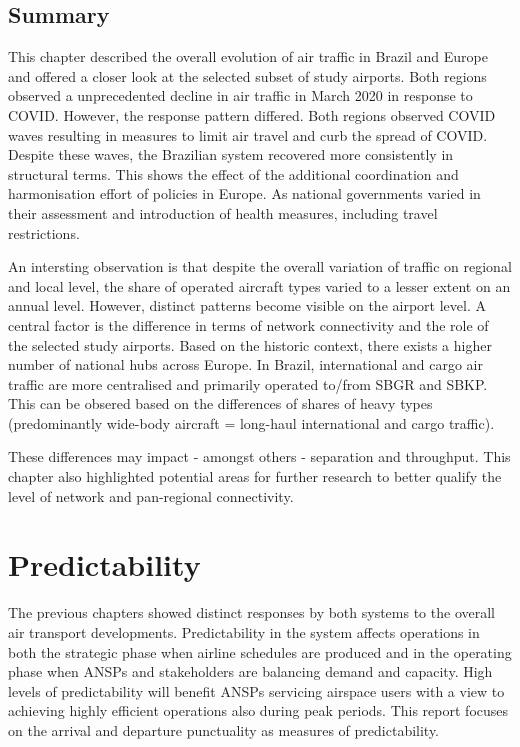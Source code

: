 \documentclass[
  a4paper,
  DIV=11,
  numbers=noendperiod]{scrreprt}
\begin{document}
\hypertarget{summary-1}{%
\section{Summary}\label{summary-1}}

This chapter described the overall evolution of air traffic in Brazil
and Europe and offered a closer look at the selected subset of study
airports. Both regions observed a unprecedented decline in air traffic
in March 2020 in response to COVID. However, the response pattern
differed. Both regions observed COVID waves resulting in measures to
limit air travel and curb the spread of COVID. Despite these waves, the
Brazilian system recovered more consistently in structural terms. This
shows the effect of the additional coordination and harmonisation effort
of policies in Europe. As national governments varied in their
assessment and introduction of health measures, including travel
restrictions.

An intersting observation is that despite the overall variation of
traffic on regional and local level, the share of operated aircraft
types varied to a lesser extent on an annual level. However, distinct
patterns become visible on the airport level. A central factor is the
difference in terms of network connectivity and the role of the selected
study airports. Based on the historic context, there exists a higher
number of national hubs across Europe. In Brazil, international and
cargo air traffic are more centralised and primarily operated to/from
SBGR and SBKP. This can be obsered based on the differences of shares of
heavy types (predominantly wide-body aircraft = long-haul international
and cargo traffic).

These differences may impact - amongst others - separation and
throughput. This chapter also highlighted potential areas for further
research to better qualify the level of network and pan-regional
connectivity.


\hypertarget{predictability}{%
\chapter{Predictability}\label{predictability}}

The previous chapters showed distinct responses by both systems to the
overall air transport developments. Predictability in the system affects
operations in both the strategic phase when airline schedules are
produced and in the operating phase when ANSPs and stakeholders are
balancing demand and capacity. High levels of predictability will
benefit ANSPs servicing airspace users with a view to achieving highly
efficient operations also during peak periods. This report focuses on
the arrival and departure punctuality as measures of predictability.
\end{document}
